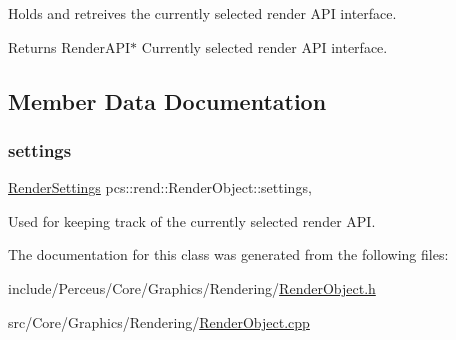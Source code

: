Holds and retreives the currently selected render A\+PI interface. 

\begin{DoxyReturn}{Returns}
Render\+A\+P\+I$\ast$ Currently selected render A\+PI interface. 
\end{DoxyReturn}


\subsection{Member Data Documentation}
\mbox{\label{classpcs_1_1rend_1_1RenderObject_a354e6b71a0f1a7229a5a57944f047ceb}} 
\subsubsection{\texorpdfstring{settings}{settings}}
{\footnotesize\ttfamily \hyperlink{structpcs_1_1rend_1_1RenderSettings}{Render\+Settings} pcs\+::rend\+::\+Render\+Object\+::settings\hspace{0.3cm}{\ttfamily [static]}, {\ttfamily [protected]}}



Used for keeping track of the currently selected render A\+PI. 



The documentation for this class was generated from the following files\+:\begin{DoxyCompactItemize}
\item 
include/\+Perceus/\+Core/\+Graphics/\+Rendering/\hyperlink{RenderObject_8h}{Render\+Object.\+h}\item 
src/\+Core/\+Graphics/\+Rendering/\hyperlink{RenderObject_8cpp}{Render\+Object.\+cpp}\end{DoxyCompactItemize}
